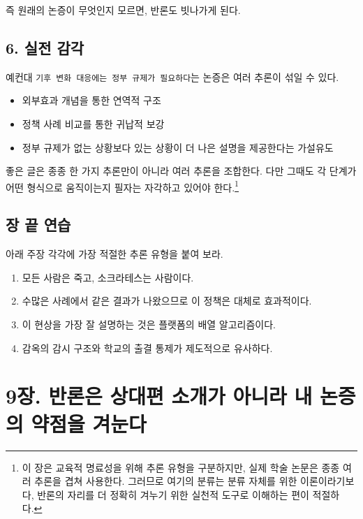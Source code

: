 즉 원래의 논증이 무엇인지 모르면, 반론도 빗나가게 된다.

\section{6. 실전 감각}\label{6-uxc2e4uxc804-uxac10uxac01}

예컨대 \texttt{기후\ 변화\ 대응에는\ 정부\ 규제가\ 필요하다}는 논증은 여러 추론이 섞일 수 있다.

\begin{itemize}
\tightlist
\item
  외부효과 개념을 통한 연역적 구조
\item
  정책 사례 비교를 통한 귀납적 보강
\item
  정부 규제가 없는 상황보다 있는 상황이 더 나은 설명을 제공한다는 가설유도
\end{itemize}

좋은 글은 종종 한 가지 추론만이 아니라 여러 추론을 조합한다. 다만 그때도 각 단계가 어떤 형식으로 움직이는지 필자는 자각하고 있어야 한다.\footnote{이 장은 교육적 명료성을 위해 추론 유형을 구분하지만, 실제 학술 논문은 종종 여러 추론을 겹쳐 사용한다. 그러므로 여기의 분류는 분류 자체를 위한 이론이라기보다, 반론의 자리를 더 정확히 겨누기 위한 실천적 도구로 이해하는 편이 적절하다.}

\section{장 끝 연습}\label{uxc7a5-uxb05d-uxc5f0uxc2b5-4}

아래 주장 각각에 가장 적절한 추론 유형을 붙여 보라.

\begin{enumerate}
\def\labelenumi{\arabic{enumi}.}
\tightlist
\item
  모든 사람은 죽고, 소크라테스는 사람이다.
\item
  수많은 사례에서 같은 결과가 나왔으므로 이 정책은 대체로 효과적이다.
\item
  이 현상을 가장 잘 설명하는 것은 플랫폼의 배열 알고리즘이다.
\item
  감옥의 감시 구조와 학교의 출결 통제가 제도적으로 유사하다.
\end{enumerate}

\chapter{9장. 반론은 상대편 소개가 아니라 내 논증의 약점을 겨눈다}\label{9uxc7a5-uxbc18uxb860uxc740-uxc0c1uxb300uxd3b8-uxc18cuxac1cuxac00-uxc544uxb2c8uxb77c-uxb0b4-uxb17cuxc99duxc758-uxc57duxc810uxc744-uxaca8uxb208uxb2e4}

